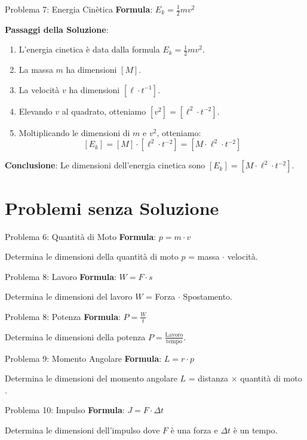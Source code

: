 \documentclass{beamer}
\begin{document}
\begin{frame}{Problema 7: Energia Cinètica}
    \textbf{Formula}: \( E_k = \frac{1}{2}mv^2 \)
    
    \textbf{Passaggi della Soluzione}:
    \begin{enumerate}
        \item L'energia cinetica è data dalla formula \( E_k = \frac{1}{2}mv^2 \).
        \item La massa \(m\) ha dimensioni \([M]\).
        \item La velocità \(v\) ha dimensioni \([\ell \cdot t^{-1}]\).
        \item Elevando \(v\) al quadrato, otteniamo \([v^2] = [\ell^2 \cdot t^{-2}]\).
        \item Moltiplicando le dimensioni di \(m\) e \(v^2\), otteniamo:
        \[
        [E_k] = [M] \cdot [\ell^2 \cdot t^{-2}] = [M \cdot \ell^2 \cdot t^{-2}]
        \]
    \end{enumerate}
    \textbf{Conclusione}: Le dimensioni dell'energia cinetica sono \([E_k] = [M \cdot \ell^2 \cdot t^{-2}]\).
\end{frame}

\section{Problemi senza Soluzione}

\begin{frame}{Problema 6: Quantità di Moto}
    \textbf{Formula}: \( p = m\cdot v \)
    
    Determina le dimensioni della quantità di moto $p$ = massa $\cdot$ velocità.
\end{frame}

\begin{frame}{Problema 8: Lavoro}
    \textbf{Formula}: \( W = F \cdot s \)
    
    Determina le dimensioni del lavoro $W$ = Forza $\cdot$ Spostamento.
\end{frame}

\begin{frame}{Problema 8: Potenza}
    \textbf{Formula}: \( P = \frac{W}{t} \)
    
    Determina le dimensioni della potenza $P =\frac{\text{Lavoro}}{\text{tempo}}$.
\end{frame}

\begin{frame}{Problema 9: Momento Angolare}
    \textbf{Formula}: \( L = r \cdot p \)
    
    Determina le dimensioni del momento angolare $L$ = distanza $\times$ quantità di moto .
\end{frame}

\begin{frame}{Problema 10: Impulso}
    \textbf{Formula}: \( J = F \cdot \Delta t \)
    
    Determina le dimensioni dell'impulso dove $F$ è una forza e $\Delta t $ è un tempo.
\end{frame}
\end{document}
